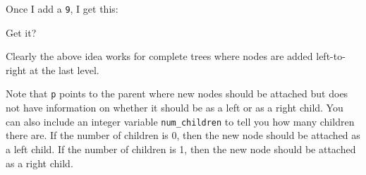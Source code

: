 Once I add a \texttt{9}, I get this:



Get it?

  
Clearly the above idea works for complete trees where
nodes are added left-to-right at the last level.

Note that \verb!p! points to the parent where new nodes should be
attached but does not have information on whether it should be
as a left or as a right child.
You can also include an integer variable \texttt{num\_children}
to tell you how many children
there are.
If the number of children is 0, then the new node should be
attached as a left child.
If the number of children is 1, then the new node should be attached
as a right child.




